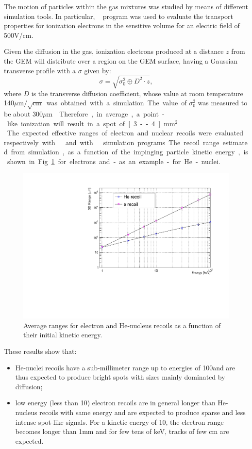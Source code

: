 \documentclass[12pt]{iopart}
\begin{document}
The motion of particles within the gas mixtures was studied by means
of different simulation tools. In particular,
\garfield~\cite{bib:garfield,bib:garfield1} program was used to
evaluate the transport properties for ionization electrons in the
sensitive volume for an electric field of 500\unit{V/cm}.

Given the diffusion in the gas, ionization electrons produced at a
distance $z$ from the GEM will distribute over a region on the GEM
surface, having a Gaussian transverse profile with a $\sigma$ given
by:
%
\begin{equation}
\label{eq:diff}
\sigma = \sqrt{\sigma^2_0 \oplus D^2 \cdot z},
\end{equation}
where $D$ is the transverse diffusion coefficient,
whose value  at room temperature
140\unit{$\mu{\mathrm{m}}/\sqrt{\mathrm{cm}}$} was obtained with a
simulation.  The value of $\sigma^2_0$ was measured to be about
300\unit{$\mu$m} \cite{bib:btf,bib:fe55New}. Therefore, in average, a
point-like ionization will result in a spot of [3--4]\unit{mm$^2$}.

The expected effective ranges of electron and nuclear recoils were
evaluated respectively with \GEANTfour~\cite{GEANT4} and with
\SRIM~\cite{bib:srim} simulation programs. The recoil range estimated
from simulation, as a function of the impinging particle kinetic
energy, is shown in Fig.~\ref{fig:range} for electrons and -as an
example- for He-nuclei.
%
\begin{figure}[ht]
  \begin{center}
    \includegraphics[width=0.49\linewidth]{figures/range_ER_NR.pdf}
    \caption{Average ranges for electron and He-nucleus recoils as a
      function of their initial kinetic energy.
      \label{fig:range}}
      \end{center}
\end{figure}
%
These results show that:
\begin{itemize}
    \item He-nuclei recoils have a sub-millimeter range up to energies
      of 100\keV and are thus expected to produce bright spots with
      sizes mainly dominated by diffusion;
    \item low energy (less than 10\keV) electron recoils are in
      general longer than He-nucleus recoils with same energy and are
      expected to produce sparse and less intense spot-like signals. For a
      kinetic energy of 10\keV, the electron range becomes longer than
      1\unit{mm} and for few tens of keV, tracks of few cm are
      expected.
\end{itemize}
\end{document}
